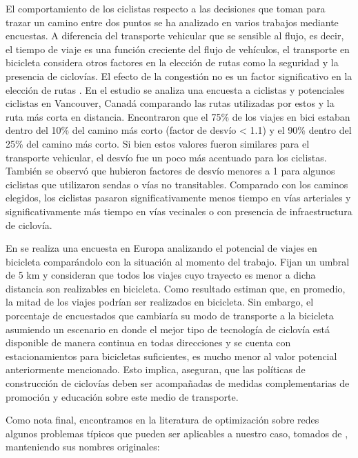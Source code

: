 \documentclass{article}
\begin{document}

  El comportamiento de los ciclistas respecto a las decisiones que toman para trazar un camino entre dos puntos se ha analizado en varios trabajos mediante encuestas. A diferencia del transporte vehicular que se sensible al flujo, es decir, el tiempo de viaje es una función creciente del flujo de vehículos, el transporte en bicicleta considera otros factores en la elección de rutas como la seguridad y la presencia de ciclovías. El efecto de la congestión no es un factor significativo en la elección de rutas \cite{broach2012}. En el estudio \cite{winters2010} se analiza una encuesta a ciclistas y potenciales ciclistas en Vancouver, Canadá comparando las rutas utilizadas por estos y la ruta más corta en distancia. Encontraron que el 75\% de los viajes en bici estaban dentro del 10\% del camino más corto (factor de desvío < 1.1) y el 90\% dentro del 25\% del camino más corto. Si bien estos valores fueron similares para el transporte vehicular, el desvío fue un poco más acentuado para los ciclistas. También se observó que hubieron factores de desvío menores a 1 para algunos ciclistas que utilizaron sendas o vías no transitables. Comparado con los caminos elegidos, los ciclistas pasaron significativamente menos tiempo en vías arteriales y significativamente más tiempo en vías vecinales o con presencia de infraestructura de ciclovía.

  En \cite{shwe2014} se realiza una encuesta en Europa analizando el potencial de viajes en bicicleta comparándolo con la situación al momento del trabajo. Fijan un umbral de 5 km y consideran que todos los viajes cuyo trayecto es menor a dicha distancia son realizables en bicicleta. Como resultado estiman que, en promedio, la mitad de los viajes podrían ser realizados en bicicleta. Sin embargo, el porcentaje de encuestados que cambiaría su modo de transporte a la bicicleta asumiendo un escenario en donde el mejor tipo de tecnología de ciclovía está disponible de manera continua en todas direcciones y se cuenta con estacionamientos para bicicletas suficientes, es mucho menor al valor potencial anteriormente mencionado. Esto implica, aseguran, que las políticas de construcción de ciclovías deben ser acompañadas de medidas complementarias de promoción y educación sobre este medio de transporte.


  Como nota final, encontramos en la literatura de optimización sobre redes algunos problemas típicos que pueden ser aplicables a nuestro caso, tomados de \cite{Crainic2021}, manteniendo sus nombres originales:
\end{document}
